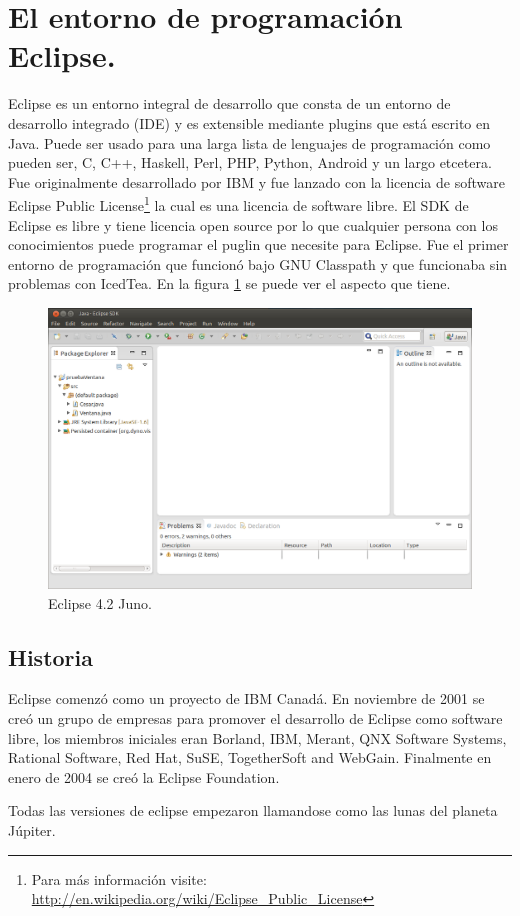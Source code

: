 \section{El entorno de programación Eclipse.}

Eclipse es un entorno integral de desarrollo que consta de un entorno de desarrollo integrado (IDE) y es extensible mediante plugins que está escrito en Java. Puede ser usado para una larga lista de lenguajes de programación como pueden ser,  C, C++, Haskell, Perl, PHP, Python, Android y un largo etcetera. Fue originalmente desarrollado por IBM y fue lanzado con la licencia de software Eclipse Public License\footnote{Para más información visite: \url{http://en.wikipedia.org/wiki/Eclipse\_Public\_License}} la cual es una licencia de software libre. El SDK de Eclipse es libre y tiene licencia open source por lo que cualquier persona con los conocimientos puede programar el puglin que necesite para Eclipse. Fue el primer entorno de programación que funcionó bajo GNU Classpath y que funcionaba sin problemas con IcedTea. En la figura \ref{fig:pantallaEclipse} se puede ver el aspecto que tiene.

\begin{figure}
  \centering
    \includegraphics[scale=0.5]{./ConocimientosPrevios/imagenes/pantallaEclipse.png}
  \caption{Eclipse 4.2 Juno.}
  \label{fig:pantallaEclipse}
\end{figure} 

\subsection{Historia}

Eclipse comenzó como un proyecto de IBM Canadá. En noviembre de 2001 se creó un grupo de empresas para promover el desarrollo de Eclipse como software libre, los miembros iniciales eran Borland, IBM, Merant, QNX Software Systems, Rational Software, Red Hat, SuSE, TogetherSoft and WebGain. Finalmente en enero de 2004 se creó la Eclipse Foundation. 

Todas las versiones de eclipse empezaron llamandose como las lunas del planeta Júpiter.


























